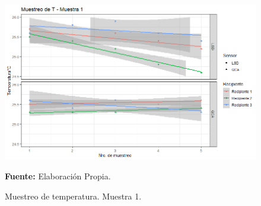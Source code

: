 \begin{figure}[H]
        \centering
        \includegraphics[width=0.7\linewidth]{Imagenes/cap4/T_M1.png}
        \caption {Muestreo de temperatura. Muestra 1. }{\textbf{Fuente:}
        Elaboraci\'on Propia. }
        \label{fig:M1T}
    \end{figure}
    
